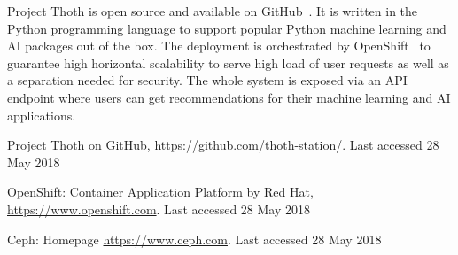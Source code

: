 \documentclass[a4paper]{llncs}
\begin{document}
Project Thoth is open source and available on GitHub~\cite{ref_thoth}. It is written in the Python programming language to support popular Python machine learning and AI packages out of the box. The deployment is orchestrated by OpenShift~\cite{ref_openshift} to guarantee high horizontal scalability to serve high load of user requests as well as a separation needed for security. The whole system is exposed via an API endpoint where users can get recommendations for their machine learning and AI applications.

%
%
%
% 
% 
%
\begin{thebibliography}{8}
Project Thoth on GitHub, \url{https://github.com/thoth-station/}. Last accessed 28 May 2018

OpenShift: Container Application Platform by Red Hat, \\ \url{https://www.openshift.com}. Last accessed 28 May 2018

Ceph: Homepage \url{https://www.ceph.com}. Last accessed 28 May 2018
\end{thebibliography}


\end{document}
